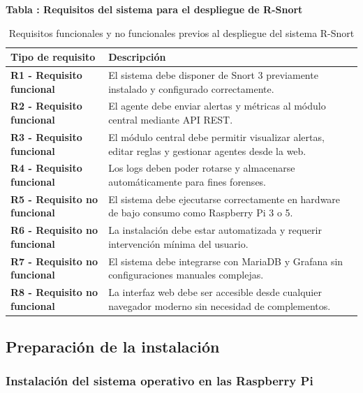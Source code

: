 \documentclass[11pt,a4paper,twoside]{report}
\begin{document}
\vspace{0.5cm}
\noindent \textbf{Tabla \thetable: Requisitos del sistema para el despliegue de R-Snort}
\begin{table}[H]
	\centering
	\begin{tabular}{|p{5.5cm}|p{8cm}|}
		\hline
		\rowcolor[HTML]{E0E0E0}
		\textbf{Tipo de requisito} & \textbf{Descripción} \\
		\hline
		\textbf{R1 - Requisito funcional} & El sistema debe disponer de Snort 3 previamente instalado y configurado correctamente. \\
		\hline
		\textbf{R2 - Requisito funcional} & El agente debe enviar alertas y métricas al módulo central mediante API REST. \\
		\hline
		\textbf{R3 - Requisito funcional} & El módulo central debe permitir visualizar alertas, editar reglas y gestionar agentes desde la web. \\
		\hline
		\textbf{R4 - Requisito funcional} & Los logs deben poder rotarse y almacenarse automáticamente para fines forenses. \\
		\hline
		\textbf{R5 - Requisito no funcional} & El sistema debe ejecutarse correctamente en hardware de bajo consumo como Raspberry Pi 3 o 5. \\
		\hline
		\textbf{R6 - Requisito no funcional} & La instalación debe estar automatizada y requerir intervención mínima del usuario. \\
		\hline
		\textbf{R7 - Requisito no funcional} & El sistema debe integrarse con MariaDB y Grafana sin configuraciones manuales complejas. \\
		\hline
		\textbf{R8 - Requisito no funcional} & La interfaz web debe ser accesible desde cualquier navegador moderno sin necesidad de complementos. \\
		\hline
	\end{tabular}
	\caption{Requisitos funcionales y no funcionales previos al despliegue del sistema R-Snort}
	\label{tab:requisitos-rsnort}
\end{table}

\subsection{Preparación de la instalación}

\subsubsection{Instalación del sistema operativo en las Raspberry Pi}
\end{document}
